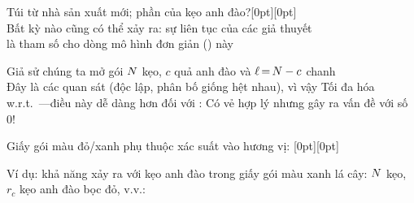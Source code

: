 \documentclass{article}
\begin{document}
\begin{huge}

Túi từ nhà sản xuất mới; phần \mat{$\theta$} của kẹo anh đào?\hfill\epsfxsize=1.25in\raisebox{-1.25in}[0pt][0pt]{} \\
Bất kỳ \mat{$\theta$} nào cũng có thể xảy ra: sự liên tục của các giả thuyết  \\
\mat{$\theta$} là tham số  cho dòng mô hình đơn giản () này 

Giả sử chúng ta mở gói \(N\) kẹo, \(c\) quả anh đào và \(\ell{\,{=}\,} N-c\) chanh\\
Đây là các quan sát  (độc lập, phân bố giống hệt nhau), vì vậy
\mat{\[
  P(\data |h_{\theta}) = \prod_{j\eq 1}^{\Ncount} P(\datum_j|h_{\theta}) =
  \theta^c\cdot (1-\theta)^{\ell}
\]}%
Tối đa hóa w.r.t.~\mat{$\theta$}---điều này dễ dàng hơn đối với :
%
Có vẻ hợp lý nhưng gây ra vấn đề với số 0!









Giấy gói màu đỏ/xanh phụ thuộc xác suất vào hương vị: \hspace*{0.75in}\epsfxsize=2.25in\raisebox{-2.5in}[0pt][0pt]{} 

Ví dụ: khả năng xảy ra với kẹo anh đào trong giấy gói màu xanh lá cây:
%
\(N\) kẹo, \(r_c\) kẹo anh đào bọc đỏ, v.v.:
%
%


\end{huge}
\end{document}
